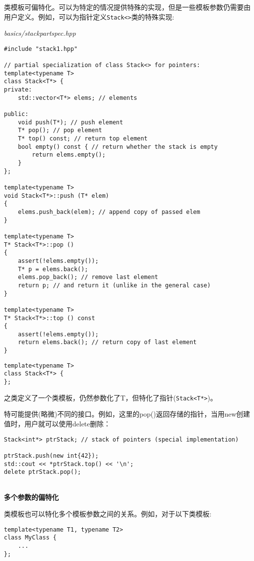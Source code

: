 类模板可偏特化。可以为特定的情况提供特殊的实现，但是一些模板参数仍需要由用户定义。例如，可以为指针定义\texttt{Stack<>}类的特殊实现:

\noindent
\textit{basics/stackpartspec.hpp}
\begin{lstlisting}[style=styleCXX]
#include "stack1.hpp"

// partial specialization of class Stack<> for pointers:
template<typename T>
class Stack<T*> {
private:
	std::vector<T*> elems; // elements
	
public:
	void push(T*); // push element
	T* pop(); // pop element
	T* top() const; // return top element
	bool empty() const { // return whether the stack is empty
		return elems.empty();
	}
};

template<typename T>
void Stack<T*>::push (T* elem)
{
	elems.push_back(elem); // append copy of passed elem
}

template<typename T>
T* Stack<T*>::pop ()
{
	assert(!elems.empty());
	T* p = elems.back();
	elems.pop_back(); // remove last element
	return p; // and return it (unlike in the general case)
}

template<typename T>
T* Stack<T*>::top () const
{
	assert(!elems.empty());
	return elems.back(); // return copy of last element
}
\end{lstlisting}

\begin{lstlisting}[style=styleCXX]
template<typename T>
class Stack<T*> {
};
\end{lstlisting}

之类定义了一个类模板，仍然参数化了T，但特化了指针(\texttt{Stack<T*>})。

特可能提供(略微)不同的接口。例如，这里的pop()返回存储的指针，当用new创建值时，用户就可以使用delete删除：

\begin{lstlisting}[style=styleCXX]
Stack<int*> ptrStack; // stack of pointers (special implementation)

ptrStack.push(new int{42});
std::cout << *ptrStack.top() << '\n';
delete ptrStack.pop();
\end{lstlisting}

\hspace*{\fill} \\ %
\noindent
\textbf{多个参数的偏特化}

类模板也可以特化多个模板参数之间的关系。例如，对于以下类模板:

\begin{lstlisting}[style=styleCXX]
template<typename T1, typename T2>
class MyClass {
	...
};
\end{lstlisting}

